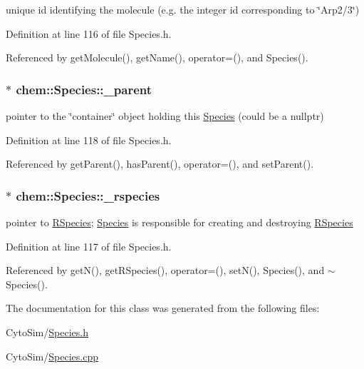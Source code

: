 unique id identifying the molecule (e.\-g. the integer id corresponding to \char`\"{}\-Arp2/3\char`\"{}) 



Definition at line 116 of file Species.\-h.



Referenced by get\-Molecule(), get\-Name(), operator=(), and Species().

\hypertarget{classchem_1_1Species_ae0743ec422b63dcb29b4cbfee484902d}{
\subsubsection[{\-\_\-parent}]{$\ast$ {\bf chem\-::\-Species\-::\-\_\-parent}}}\label{classchem_1_1Species_ae0743ec422b63dcb29b4cbfee484902d}


pointer to the \char`\"{}container\char`\"{} object holding this \hyperlink{classchem_1_1Species}{Species} (could be a nullptr) 



Definition at line 118 of file Species.\-h.



Referenced by get\-Parent(), has\-Parent(), operator=(), and set\-Parent().

\hypertarget{classchem_1_1Species_aa6a2ec40f6f1b08c76a184d11571c570}{
\subsubsection[{\-\_\-rspecies}]{$\ast$ {\bf chem\-::\-Species\-::\-\_\-rspecies}}}\label{classchem_1_1Species_aa6a2ec40f6f1b08c76a184d11571c570}


pointer to \hyperlink{classchem_1_1RSpecies}{R\-Species}; \hyperlink{classchem_1_1Species}{Species} is responsible for creating and destroying \hyperlink{classchem_1_1RSpecies}{R\-Species} 



Definition at line 117 of file Species.\-h.



Referenced by get\-N(), get\-R\-Species(), operator=(), set\-N(), Species(), and $\sim$\-Species().



The documentation for this class was generated from the following files\-:\begin{DoxyCompactItemize}
\item 
Cyto\-Sim/\hyperlink{Species_8h}{Species.\-h}\item 
Cyto\-Sim/\hyperlink{Species_8cpp}{Species.\-cpp}\end{DoxyCompactItemize}
